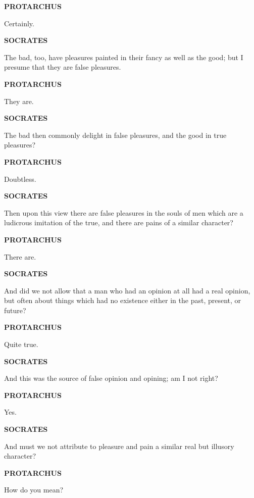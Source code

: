 \documentclass[11pt,letter]{article}
\begin{document}
\par \textbf{PROTARCHUS}
\par   Certainly.

\par \textbf{SOCRATES}
\par   The bad, too, have pleasures painted in their fancy as well as the good; but I presume that they are false pleasures.

\par \textbf{PROTARCHUS}
\par   They are.

\par \textbf{SOCRATES}
\par   The bad then commonly delight in false pleasures, and the good in true pleasures?

\par \textbf{PROTARCHUS}
\par   Doubtless.

\par \textbf{SOCRATES}
\par   Then upon this view there are false pleasures in the souls of men which are a ludicrous imitation of the true, and there are pains of a similar character?

\par \textbf{PROTARCHUS}
\par   There are.

\par \textbf{SOCRATES}
\par   And did we not allow that a man who had an opinion at all had a real opinion, but often about things which had no existence either in the past, present, or future?

\par \textbf{PROTARCHUS}
\par   Quite true.

\par \textbf{SOCRATES}
\par   And this was the source of false opinion and opining; am I not right?

\par \textbf{PROTARCHUS}
\par   Yes.

\par \textbf{SOCRATES}
\par   And must we not attribute to pleasure and pain a similar real but illusory character?

\par \textbf{PROTARCHUS}
\par   How do you mean?
\end{document}
